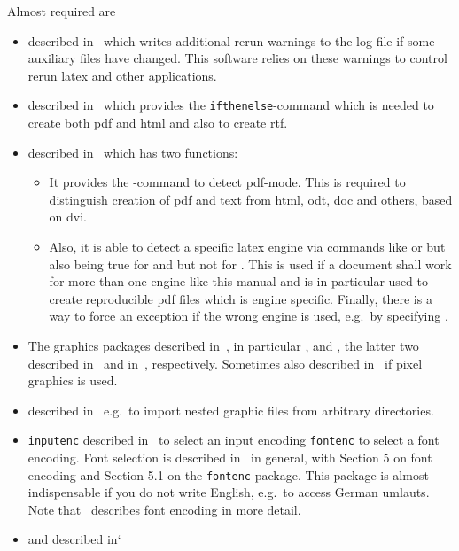 \noindent
Almost required are 
%
\begin{itemize}
\item
{} described in~\cite{RerunFChkP} 
which writes additional rerun warnings to the log file 
if some auxiliary files have changed. 
This software relies on these warnings 
to control rerun latex and other applications. 
\item
{} described in~\cite{IfThenP} 
which provides the \texttt{ifthenelse}-command 
which is needed to create both pdf and html and also to create rtf. 
\item
{} described in~\cite{IfTeXP} which has two functions: 
\begin{itemize}
  \item 
  It provides the -command to detect pdf-mode. 
  This is required to distinguish creation of pdf and text 
  from html, odt, doc and others, based on dvi. 
  \item 
  Also, it is able to detect a specific latex engine via commands 
  like  or  but also  
  being true for \lualatex{} and \xelatex{} but not for \pdflatex. 
  This is used if a document shall work for more than one engine 
  like this manual and is in particular used to create reproducible pdf files 
  which is engine specific. 
  Finally, there is a way to force an exception if the wrong engine is used, 
  e.g.~by specifying . 
\end{itemize}
\item
The graphics packages described in~\cite{GraX}, 
in particular ,  and , 
the latter two described in~\cite{XColorP} and in~\cite{TransP}, 
respectively. 
Sometimes also  described in~\cite{BmpP} 
if pixel graphics is used. 
\item
{} described in~\cite{ImpoP} 
e.g.~to import nested graphic files from arbitrary directories. 
\item
\texttt{inputenc} described in~\cite{InputencP} 
to select an input encoding 
\texttt{fontenc} to select a font encoding. 
Font selection is described in~\cite{FontSel} in general, 
with Section 5 on font encoding and 
Section 5.1 on the \texttt{fontenc} package. 
This package is almost indispensable if you do not write English, 
e.g.~to access German umlauts. 
Note that~\cite{FontEnc} describes font encoding in more detail. 
\item 
{} and  described in`\cite{MkidxShIdxP} 

\end{itemize}
